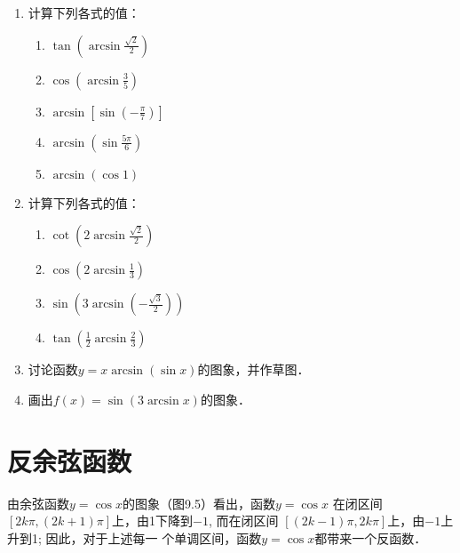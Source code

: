 \begin{enumerate}
\item 计算下列各式的值：
\begin{multicols}{2}
    \begin{enumerate}
        \item $\tan\left(\arcsin\frac{\sqrt{2}}{2}\right)$
        \item $\cos\left(\arcsin \frac{3}{5}\right)$
        \item $\arcsin \left[\sin\left(-\frac{\pi}{7}\right)\right]$
        \item $\arcsin\left(\sin\frac{5\pi}{6}\right)$
        \item $\arcsin(\cos1)$
    \end{enumerate}
    \end{multicols}
    \item 计算下列各式的值：
\begin{multicols}{2}
    \begin{enumerate}
        \item $\cot\left(2\arcsin\frac{\sqrt{2}}{2}\right)$
        \item $\cos\left(2\arcsin\frac{1}{3}\right)$
        \item $\sin\left(3\arcsin\left(-\frac{\sqrt{3}}{2}\right)\right)$
        \item $\tan\left(\frac{1}{2}\arcsin\frac{2}{3}\right)$
    \end{enumerate}
    \end{multicols}

    \item 讨论函数$y=x \arcsin(\sin x)$的图象，并作草图．
\item 画出$f(x)=\sin(3\arcsin x)$的图象．
\end{enumerate}

\section{反余弦函数}
由余弦函数$y=\cos x$的图象（图9.5）看出，函数$y=\cos x$
在闭区间$[2k\pi ,(2k+1)\pi ]$上，由1下降到$-1$, 而在闭区间
$[(2k-1)\pi ,2k\pi]$上，由$-1$上升到1; 因此，对于上述每一
个单调区间，函数$y=\cos x$都带来一个反函数．

\begin{figure}[htp]
    \centering
{}
    \caption{}
\end{figure}

